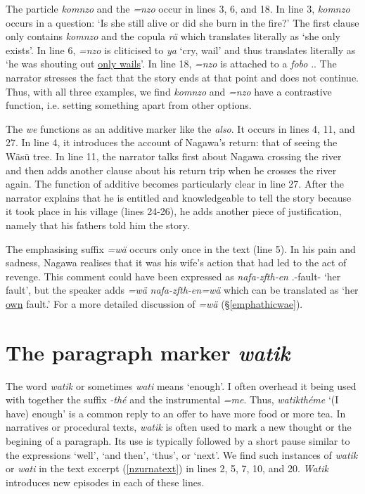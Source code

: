 The particle \emph{komnzo} and the  \emph{=nzo} occur in lines 3, 6, and 18. In line 3, \emph{komnzo} occurs in a question: `Is she still alive or did she burn in the fire?' The first clause only contains \emph{komnzo} and the copula \emph{rä} which translates literally as `she only exists'. In line 6, \emph{=nzo} is cliticised to \emph{ya} `cry, wail' and thus translates literally as `he was shouting out \uline{only wails}'. In line 18, \emph{=nzo} is attached to a  \emph{fobo} \Dist.{\All}. The narrator stresses the fact that the story ends at that point and does not continue. Thus, with all three examples, we find \emph{komnzo} and \emph{=nzo} have a contrastive function, i.e. setting something apart from other options.

The  \emph{we} functions as an additive marker like the   \emph{also}. It occurs in lines 4, 11, and 27. In line 4, it introduces the account of Nagawa's return: that of seeing the Wäsü tree. In line 11, the narrator talks first about Nagawa crossing the river and then adds another clause about his return trip when he crosses the river again. The function of additive  becomes particularly clear in line 27. After the narrator explains that he is entitled and knowledgeable to tell the story because it took place in his village (lines 24-26), he adds another piece of justification, namely that his fathers told him the story.

The emphasising suffix \emph{=wä} occurs only once in the text (line 5). In his pain and sadness, Nagawa realises that it was his wife's action that had led to the act of revenge. This comment could have been expressed as \emph{nafa-zfth-en} \Third.\Poss-fault-{\Loc} `her fault', but the speaker adds \emph{=wä} \emph{nafa-zfth-en=wä} which can be translated as `her \uline{own} fault.' For a more detailed discussion of \emph{=wä} ({\S}\ref{emphathicwae}).

\section{The paragraph marker \emph{watik}} \label{watik}

The word \emph{watik} or sometimes \emph{wati} means `enough'. I often overhead it being used with together the  suffix \emph{-thé} and the instrumental \emph{=me}. Thus, \emph{watikthéme} `(I have) enough' is a common reply to an offer to have more food or more tea. In narratives or procedural texts, \emph{watik} is often used to mark a new thought or the begining of a paragraph. Its use is typically followed by a short pause similar to the  expressions `well', `and then', `thus', or `next'. We find such instances of \emph{watik} or \emph{wati} in the text excerpt (\ref{nzurnatext}) in lines 2, 5, 7, 10, and 20. \emph{Watik} introduces new episodes in each of these lines.

